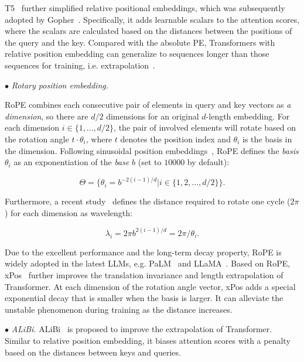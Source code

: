  {T5~\cite{Raffel-JMLR-2020-Exploring} further simplified relative positional embeddings, which was subsequently adopted by Gopher~\cite{Rae-arxiv-2021-Scaling}.} Specifically, it adds learnable scalars to the attention scores, where the scalars are calculated based on the distances between the positions of the query and the key. Compared with the absolute PE, Transformers with relative position embedding can generalize to sequences longer than those sequences for training, i.e. extrapolation~\cite{Press-ICLR-2022-Train}. 

    $\bullet$ \emph{Rotary position embedding.} 

    {RoPE combines each consecutive pair of elements in query and key vectors as \emph{a dimension},   so there are $d/2$  dimensions for an original $d$-length embedding. For each dimension $i \in \{1, \dots, d/2\}$, the  pair of involved elements will rotate based on the rotation angle $t\cdot \theta_i$, where $t$ denotes  the position index and $\theta_i$ is the basis in the dimension. Following sinusoidal position embeddings~\cite{Vaswani-NIPS-2017-Attention}, RoPE defines the \emph{basis}  $\theta_i$ as an exponentiation of the \emph{base} $b$ (set to $10000$ by  default):}

\begin{equation}
    \Theta = \{\theta_i = b^{-2(i-1)/d} | i \in \{1, 2, \dots , d/2 \}\}.\label{eq:basis}
\end{equation}

{Furthermore, a recent study~\cite{Peng-arxiv-2023-Yarn} defines the distance required to rotate one cycle ($2\pi$) for each dimension as wavelength:}

\begin{equation}
      \lambda_i = 2\pi b^{2(i-1)/d}=2 \pi / \theta_i.\label{eq:wavelength}
\end{equation}

       

Due to the excellent performance and the long-term decay property, RoPE is widely adopted in the latest LLMs, e.g. PaLM~\cite{Chowdhery-arxiv-2022-PaLM} and LLaMA~\cite{Touvron-arxiv-2023-LLaMA}. Based on RoPE,  xPos~\cite{Sun-2022-arxiv-Length} further improves the translation invariance and length extrapolation of Transformer. At each dimension of the rotation angle vector, xPos adds a special exponential decay that is smaller when the basis is larger. It can alleviate the unstable phenomenon {during training} as the distance increases. 

    $\bullet$ \emph{ALiBi.} ALiBi~\cite{Press-ICLR-2022-Train} is proposed to improve the extrapolation of Transformer. Similar to relative position embedding, it biases attention scores with a penalty based on the distances between keys and queries. 


